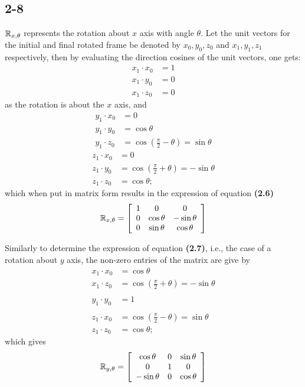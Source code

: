 \subsection*{2-8}
$\mathbb{R}_{x,\theta}$ represents the rotation about $x$ axis with angle $\theta$. Let the unit vectors for the initial and final rotated frame be denoted by $x_0,y_0,z_0$ and $x_1,y_1,z_1$ respectively, then by evaluating the direction cosines of the unit vectors, one gets:
\begin{align*}
	x_1 \cdot x_0 &= 1 \\
	x_1 \cdot y_0 &= 0 \\ 
	x_1 \cdot z_0 &= 0
\end{align*}
as the rotation is about the $x$ axis, and
\begin{align*}
y_1 \cdot x_0 &= 0 \\
y_1 \cdot y_0 &= \cos\theta \\
y_1 \cdot z_0 &= \cos(\frac{\pi}{2}-\theta) = \sin\theta
\end{align*}
\begin{align*}
z_1 \cdot x_0 &= 0 \\
z_1 \cdot y_0 &= \cos(\frac{\pi}{2}+\theta) = -\sin\theta \\
z_1 \cdot z_0 &=  \cos\theta; 
\end{align*}
which when put in matrix form results in the expression of equation \textbf{(2.6)}
\begin{align*}
\mathbb{R}_{x,\theta}=\left[\begin{array}{ccc} 
1 & 0 & 0 \\
0 & \cos\theta & -\sin\theta \\  
0 & \sin\theta &  \cos\theta    
\end{array}\right]
\end{align*}

Similarly to determine the expression of equation \textbf{(2.7)}, i.e., the case of a rotation about $y$ axis, the non-zero entries of the matrix are give by
\begin{align*}
x_1 \cdot x_0 &= \cos\theta \\
x_1 \cdot z_0 &= \cos(\frac{\pi}{2}+\theta) = -\sin\theta \\~\\
y_1 \cdot y_0 &= 1 \\~\\ 
z_1 \cdot x_0 &=  \cos(\frac{\pi}{2}-\theta) = \sin\theta \\
z_1 \cdot z_0 &=  \cos\theta; 
\end{align*}
which gives
\begin{align*}
\mathbb{R}_{y,\theta}=\left[\begin{array}{ccc} 
\cos\theta & 0 & \sin\theta \\
 0 & 1 & 0 \\  
-\sin\theta & 0 &  \cos\theta    
\end{array}\right]
\end{align*}

